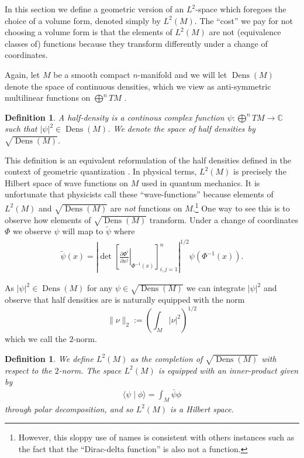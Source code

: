 \documentclass[12pt]{amsart}
\newcommand{\pder}[2]{\ensuremath{\frac{ \partial #1}{\partial #2}}}
\newtheorem{defn}[thm]{Definition}
\DeclareMathOperator{\Dens}{Dens}
\begin{document}
In this section we define a geometric version of an $L^{2}$-space which foregoes the choice of a volume form, denoted simply by $L^{2}(M)$.
The ``cost'' we pay for not choosing a volume form is that the elements of $L^{2}(M)$ are not (equivalence classes of) functions because they transform differently under a change of coordinates.

Again, let $M$ be a smooth compact $n$-manifold
and we will let $\Dens(M)$ denote the space of continuous densities,
which we view as anti-symmetric multilinear functions on $\bigoplus^n TM$ \cite[Chapter 16]{Lee2006}.

\begin{defn}\label{def:half density}
	A half-density is a continous complex function $\psi : \bigoplus^n TM \to \mathbb{C}$
	such that $| \psi |^{2} \in \Dens(M)$.
	We denote the space of half densities by $\sqrt{\Dens(M)}$.
\end{defn}

This definition is an equivalent reformulation of the half densities defined in the context of geometric quantization \cite{GuilleminSternberg1970,BatesWeinstein1997}.
In physical terms, $L^{2}(M)$ is precisely the Hilbert space of wave functions on $M$ used in quantum mechanics.
It is unfortunate that physicists call these ``wave-functions''
because elements of $L^{2}(M)$ and $\sqrt{\Dens(M)}$ are \emph{not} functions on $M$.\footnote{However, this sloppy use of names is consistent with others instances such as the fact that the ``Dirac-delta function'' is also not a function.}
One way to see this is to observe how elements of $\sqrt{\Dens(M)}$ transform.
Under a change of coordinates $\Phi$ we observe $\psi$ will map to $\tilde \psi$ where
\begin{align}
	\tilde{\psi}(x)  =  \left| \det \left[ \left. \pder{\Phi^{i}}{x^{j}} \right|_{\Phi^{-1}(x)} \right]_{i,j=1}^{n} \right|^{1/2} \psi( \Phi^{-1}(x) ). \label{eq:transformation law}
\end{align}


As $|\psi|^{2} \in \Dens(M)$ for any $\psi \in \sqrt{\Dens(M)}$ we can integrate $|\psi|^{2}$
and observe that half densities are is naturally equipped with the norm $$\| \nu \|_2 :=  \left( \int_M |\nu|^2 \right)^{1/2}$$ which we call the $2$-norm.

\begin{defn}
	We define $L^{2}(M)$ as the completion of $\sqrt{ \Dens(M)}$ with respect to the $2$-norm.
	The space $L^{2}(M)$ is equipped with an inner-product given by
	\begin{align*}
		\langle \psi \mid \phi \rangle = \int_{M} \bar \psi \phi
	\end{align*}
	through polar decomposition, and so $L^{2}(M)$ is a Hilbert space.
\end{defn}
\end{document}
